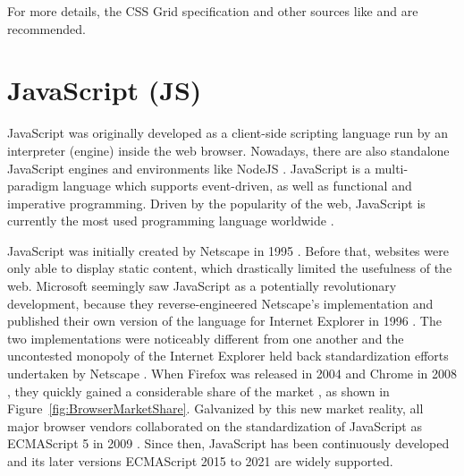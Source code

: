 For more details, the CSS Grid specification \parencite{CSSGrid} and
other sources like \textcite{GridLayoutInCSS} and
\textcite{House-GridGuide} are recommended.




\section{JavaScript (JS)}
\label{sec:JS}

JavaScript was originally developed as a client-side scripting
language run by an interpreter (engine) inside the web browser.
Nowadays, there are also standalone JavaScript engines and
environments like NodeJS \parencite{NodeJS}. JavaScript is a
multi-paradigm language which supports event-driven, as well as
functional and imperative programming. Driven by the popularity of the
web, JavaScript is currently the most used programming language
worldwide \parencite{StatisticProgrammingLanguageUsage}.

JavaScript was initially created by Netscape in 1995
\parencite{JSFirstRelease}. Before that, websites were only able to
display static content, which drastically limited the usefulness of
the web. Microsoft seemingly saw JavaScript as a potentially
revolutionary development, because they reverse-engineered Netscape's
implementation and published their own version of the language for
Internet Explorer in 1996 \parencite{JSIERelease}. The two
implementations were noticeably different from one another and the
uncontested monopoly of the Internet Explorer
\parencite{BrowserMarketShareEarly} held back standardization efforts
undertaken by Netscape \parencite{ECMAScript1}. When Firefox was
released in 2004 \parencite{FirefoxFirstRelease} and Chrome in 2008
\parencite{ChromeFirstRelease}, they quickly gained a considerable
share of the market \parencite{BrowserMarketShare}, as shown in
Figure~\ref{fig:BrowserMarketShare}. Galvanized by this new market
reality, all major browser vendors collaborated on the standardization
of JavaScript as ECMAScript 5 in 2009 \parencite{ECMAScript5}. Since
then, JavaScript has been continuously developed and its later
versions ECMAScript 2015 to 2021
\parencite{ECMAScript6, ECMAScript7, ECMAScript8, ECMAScript9, ECMAScript10, ECMAScript11, ECMAScript12}
are widely supported.


